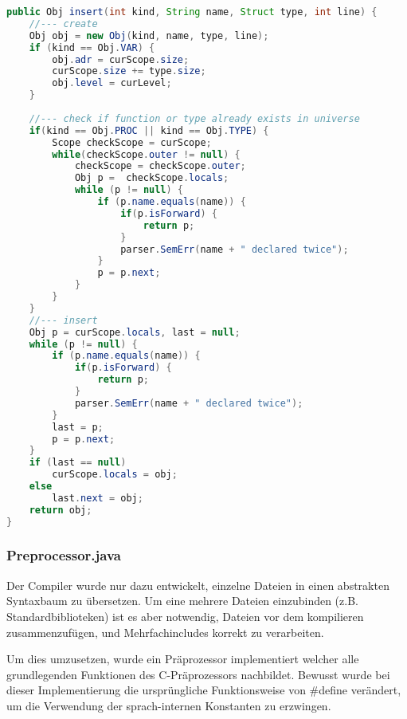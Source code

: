 \begin{lstlisting}[language=Java]
public Obj insert(int kind, String name, Struct type, int line) {
	//--- create
	Obj obj = new Obj(kind, name, type, line);
	if (kind == Obj.VAR) {
		obj.adr = curScope.size;
		curScope.size += type.size;
		obj.level = curLevel;
	}
	
	//--- check if function or type already exists in universe
	if(kind == Obj.PROC || kind == Obj.TYPE) {
		Scope checkScope = curScope;
		while(checkScope.outer != null) {
			checkScope = checkScope.outer;
			Obj p =  checkScope.locals;
			while (p != null) {
				if (p.name.equals(name)) {
					if(p.isForward) {
						return p;
					}
					parser.SemErr(name + " declared twice");
				}
				p = p.next;
			}
		}
	}
	//--- insert
	Obj p = curScope.locals, last = null;
	while (p != null) {
		if (p.name.equals(name)) {
			if(p.isForward) {
				return p;
			}
			parser.SemErr(name + " declared twice");
		}
		last = p;
		p = p.next;
	}
	if (last == null)
		curScope.locals = obj;
	else
		last.next = obj;
	return obj;
}
\end{lstlisting}




\subsubsection{Preprocessor.java}

Der Compiler wurde nur dazu entwickelt, einzelne Dateien in einen abstrakten Syntaxbaum zu \"ubersetzen. Um eine mehrere Dateien einzubinden (z.B. Standardbiblioteken) ist es aber notwendig, Dateien vor dem kompilieren zusammenzuf\"ugen, und Mehrfachincludes korrekt zu verarbeiten.

Um dies umzusetzen, wurde ein Pr\"aprozessor implementiert welcher alle grundlegenden Funktionen des C-Pr\"aprozessors nachbildet. Bewusst wurde bei dieser Implementierung die urspr\"ungliche Funktionsweise von \#define ver\"andert, um die Verwendung der sprach-internen Konstanten zu erzwingen.

